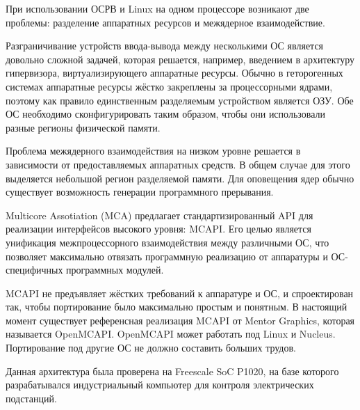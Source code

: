 \documentclass[10pt, a5paper]{article}
\begin{document}
При использовании ОСРВ и Linux на одном процессоре возникают две проблемы: разделение аппаратных ресурсов и межядерное взаимодействие.

Разграничивание устройств ввода-вывода между несколькими ОС является довольно сложной задачей, которая решается, например, введением в архитектуру гипервизора, виртуализирующего аппаратные ресурсы. Обычно в геторогенных системах аппаратные ресурсы жёстко закреплены за процессорными ядрами, поэтому как правило единственным разделяемым устройством является ОЗУ. Обе ОС необходимо сконфигурировать таким образом, чтобы они использовали разные регионы физической памяти.

Проблема межядерного взаимодействия на низком уровне решается в зависимости от предоставляемых аппаратных средств. В общем случае для этого выделяется небольшой регион разделяемой памяти. Для оповещения ядер обычно существует возможность генерации программного прерывания.

Multicore Assotiation (MCA) предлагает стандартизированный API для реализации интерфейсов высокого уровня: MCAPI. Его целью является унификация межпроцессорного взаимодействия между различными ОС, что позволяет максимально отвязать программную реализацию от аппаратуры и ОС-специфичных программных модулей.

MCAPI не предъявляет жёстких требований к аппаратуре и ОС, и спроектирован так, чтобы портирование было максимально простым и понятным. В настоящий момент существует референсная реализация MCAPI от Mentor Graphics, которая называется OpenMCAPI. OpenMCAPI может работать под Linux и Nucleus. Портирование под другие ОС не должно составить больших трудов.

Данная архитектура была проверена на Freescale SoC P1020, на базе которого разрабатывался индустриальный компьютер для контроля электрических подстанций.
\end{document}
